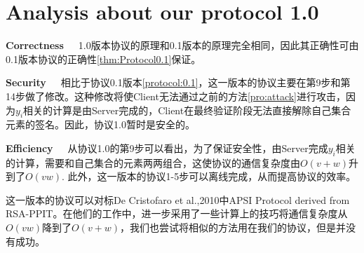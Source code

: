\section{Analysis about our protocol 1.0}
\noindent\textbf{Correctness}~~~1.0版本协议的原理和0.1版本的原理完全相同，因此其正确性可由0.1版本协议的正确性\ref{thm:Protocol0.1}保证。

\noindent\textbf{Security}~~~相比于协议0.1版本\ref{protocol:0.1}，这一版本的协议主要在第9步和第14步做了修改。这种修改将使Client无法通过之前的方法\ref{pro:attack}进行攻击，因为$y_i$相关的计算是由Server完成的，Client在最终验证阶段无法直接解除自己集合元素的签名。因此，协议1.0暂时是安全的。

\noindent\textbf{Efficiency}~~~从协议1.0的第9步可以看出，为了保证安全性，由Server完成$y_i$相关的计算，需要和自己集合的元素两两组合，这使协议的通信复杂度由$O(v+w)$升到了$O(vw)$. 此外，这一版本的协议1-5步可以离线完成，从而提高协议的效率。



这一版本的协议可以对标De Cristofaro et al.,2010中APSI Protocol derived from RSA-PPIT\cite{de2010practical}。在他们的工作中，进一步采用了一些计算上的技巧将通信复杂度从$O(vw)$降到了$O(v+w)$，我们也尝试将相似的方法用在我们的协议，但是并没有成功。

\newpage

